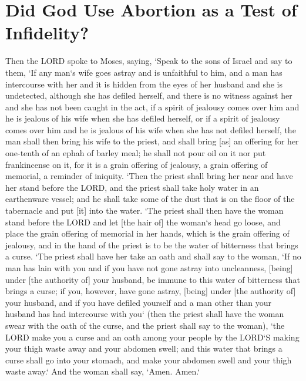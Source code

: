 \pagebreak

\section{Did God Use Abortion as a Test of Infidelity?}
\begin{scripture}[Numbers 5:11-31]
    Then the LORD spoke to Moses, saying,
    `Speak to the sons of Israel and say to them, `If any man`s wife goes astray and is unfaithful to him,
    and a man has intercourse with her and it is hidden from the eyes of her husband and she is undetected, although she has defiled herself, and there is no witness against her and she has not been caught in the act,
    if a spirit of jealousy comes over him and he is jealous of his wife when she has defiled herself, or if a spirit of jealousy comes over him and he is jealous of his wife when she has not defiled herself,
    the man shall then bring his wife to the priest, and shall bring [as] an offering for her one-tenth of an ephah of barley meal; he shall not pour oil on it nor put frankincense on it, for it is a grain offering of jealousy, a grain offering of memorial, a reminder of iniquity.
    `Then the priest shall bring her near and have her stand before the LORD,
    and the priest shall take holy water in an earthenware vessel; and he shall take some of the dust that is on the floor of the tabernacle and put [it] into the water.
    `The priest shall then have the woman stand before the LORD and let [the hair of] the woman`s head go loose, and place the grain offering of memorial in her hands, which is the grain offering of jealousy, and in the hand of the priest is to be the water of bitterness that brings a curse.
    `The priest shall have her take an oath and shall say to the woman, `If no man has lain with you and if you have not gone astray into uncleanness, [being] under [the authority of] your husband, be immune to this water of bitterness that brings a curse;
    if you, however, have gone astray, [being] under [the authority of] your husband, and if you have defiled yourself and a man other than your husband has had intercourse with you`
    (then the priest shall have the woman swear with the oath of the curse, and the priest shall say to the woman), `the LORD make you a curse and an oath among your people by the LORD`S making your thigh waste away and your abdomen swell;
    and this water that brings a curse shall go into your stomach, and make your abdomen swell and your thigh waste away.` And the woman shall say, `Amen. Amen.`

\end{scripture}
